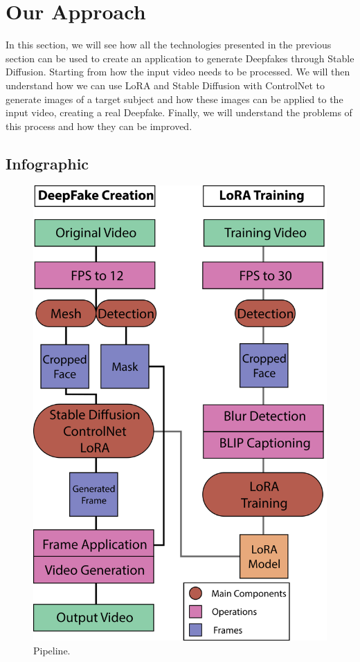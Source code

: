 \documentclass[preprint]{elsarticle}
\begin{document}
\section{Our Approach} \label{ch:project}
In this section, we will see how all the technologies presented in the previous 
section can be used to create an application to generate Deepfakes through Stable Diffusion. 
Starting from how the input video needs to be processed. 
We will then understand how we can use LoRA and Stable Diffusion with ControlNet to 
generate images of a target subject and how these images can be applied to the input video, 
creating a real Deepfake. 
Finally, we will understand the problems of this process and how they can be improved.


\subsection{Infographic} \label{sec:project_info}

\begin{figure}[t]
	\centering
	\includegraphics[scale=0.65]{img/svg/Info.png}
	\caption{Pipeline.}\label{fig:project}
\end{figure}
\end{document}
